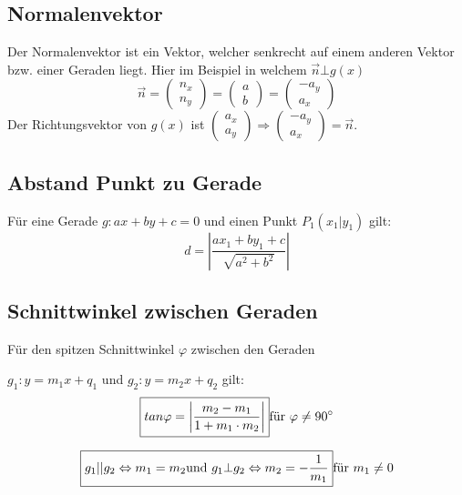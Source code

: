 \subsection{Normalenvektor}
Der Normalenvektor ist ein Vektor, welcher senkrecht auf einem anderen Vektor bzw. einer Geraden liegt. Hier im Beispiel in welchem $ \vec{n} \bot g(x)$
\[ \boxed{ \vec{n} = 
	\left( 
		\begin{array}{cc} 
	  		n_x \\ n_y
		\end{array}
    \right)
    =
    \left( 
		\begin{array}{cc} 
			a \\ b
		\end{array}
    \right)
    =
    \left( 
		\begin{array}{cc} 
			-a_y \\ a_x
		\end{array}
    \right)
} \]
\noindent
Der Richtungsvektor von $g(x)$ ist 
$  
	\left( 
		\begin{array}{cc} 
	  		a_x \\ a_y
		\end{array}
    \right)
    \Rightarrow 
    \left( 
		\begin{array}{cc} 
	  		-a_y \\ a_x
		\end{array}
    \right)
    = \vec{n}
$.

\subsection{Abstand Punkt zu Gerade}
Für eine Gerade $g: ax + by + c = 0$ und einen Punkt $P_1 (x_1 | y_1)$ gilt:
\[ \boxed{ d = \left| \frac{ax_1 + by_1 + c}{\sqrt{a^2 + b^2}} \right| } \]

\subsection{Schnittwinkel zwischen Geraden}
Für den spitzen Schnittwinkel $\varphi$ zwischen den Geraden 

$g_1: y = m_1x + q_1$ und $g_2: y = m_2x + q_2$ gilt:
\[ \boxed{ tan\varphi = \left| \frac{m_2 - m_1}{1 + m_1 \cdot m_2} \right| } \\ \text{für } \varphi \neq 90^{\circ} \]

\[ \boxed{ g_1 || g_2 \Leftrightarrow m_1 = m_2 \text{und } g_1 \bot g_2 \Leftrightarrow m_2 = - \frac{1}{m_1} } \\ \text{für } m_1 \neq 0 \]

